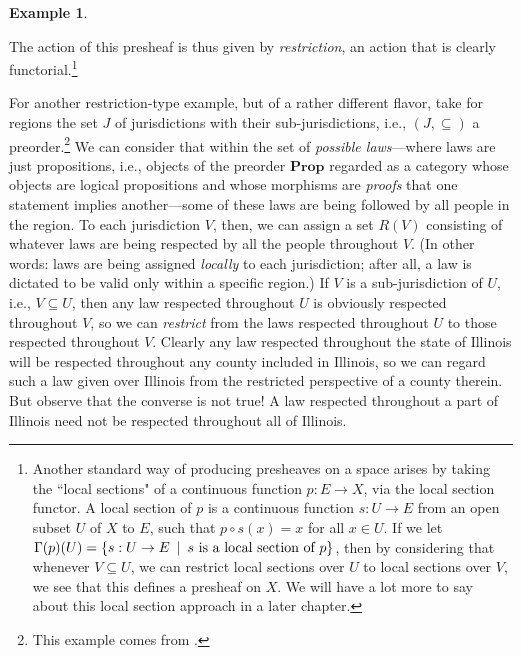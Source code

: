\documentclass[a4paper]{book}
\theoremstyle{definition}
\newtheorem{example}{Example}[section]
\theoremstyle{definition}
\theoremstyle{definition}
\theoremstyle{theorem}
\theoremstyle{definition}
\begin{document}
\begin{example}
\begin{center}
		\end{center} \vspace*{-1cm} 
		The action of this presheaf is thus given by \textit{restriction}, an action that is clearly functorial.\footnote{Another standard way of producing presheaves on a space arises by taking the ``local sections" of a continuous function $p: E \rightarrow X$, via the local section functor. A local section of $p$ is a continuous function $s: U \rightarrow E$ from an open subset $U$ of $X$ to $E$, such that $p \circ s (x) = x$ for all $x \in U$. If we let $\Gamma(p)(U) = \{s: U \rightarrow E \hspace*{0.5em} | \hspace*{0.5em} s \text{ is a local section of } p \}$, then by considering that whenever $V \subseteq  U$, we can restrict local sections over $U$ to local sections over $V$, we see that this defines a presheaf on $X$. We will have a lot more to say about this local section approach in a later chapter.}\par 
For another restriction-type example, but of a rather different flavor, take for regions the set $J$ of jurisdictions with their sub-jurisdictions, i.e., $(J, \subseteq )$ a preorder.\footnote{This example comes from \cite{spivak_category_2014}.} We can consider that within the set of \textit{possible laws}---where laws are just propositions, i.e., objects of the preorder $\textbf{Prop}$ regarded as a category whose objects are logical propositions and whose morphisms are \textit{proofs} that one statement implies another---some of these laws are being followed by all people in the region. To each jurisdiction $V$, then, we can assign a set $R(V)$ consisting of whatever laws are being respected by all the people throughout $V$. (In other words: laws are being assigned \textit{locally} to each jurisdiction; after all, a law is dictated to be valid only within a specific region.) If $V$ is a sub-jurisdiction of $U$, i.e., $V \subseteq  U$, then any law respected throughout $U$ is obviously respected throughout $V$, so we can \textit{restrict} from the laws respected throughout $U$ to those respected throughout $V$. Clearly any law respected throughout the state of Illinois will be respected throughout any county included in Illinois, so we can regard such a law given over Illinois from the restricted perspective of a county therein. But observe that the converse is not true! A law respected throughout a part of Illinois need not be respected throughout all of Illinois.\par 

\end{example}
\end{document}
